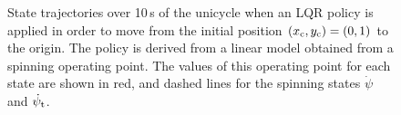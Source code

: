 \begin{figure}
\caption{State trajectories over 10$\,$s of the unicycle when an LQR policy is applied in order to move from the initial position $(x_{\text{c}},y_{\text{c}}) = (0,1)$ to the origin. The policy is derived from a linear model obtained from a spinning operating point. The values of this operating point for each state are shown in red, and dashed lines for the spinning states $\dot\psi$ and $\dot\psi_{\text{t}}$.}
\label{fig:LQuni}
\end{figure}



